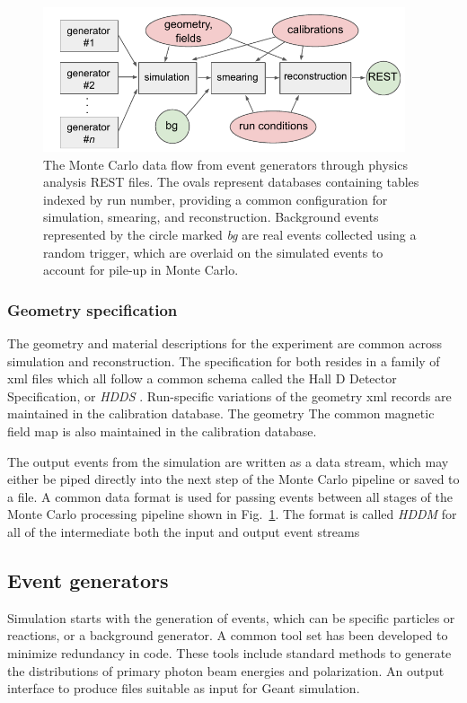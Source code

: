 \begin{figure}[t]\centering
\includegraphics[width=0.95\textwidth]{figures/MonteCarlo_flow.pdf}
\caption[]{\label{fig:MC-data-flow}The Monte Carlo data flow from event generators through physics analysis REST files. The ovals represent databases containing tables indexed by run number, providing a common configuration for simulation, smearing, and reconstruction. Background events represented by the circle marked \emph{bg} are real events collected using a random trigger, which are overlaid on the simulated events to account for pile-up in Monte Carlo.}
\end{figure}

\subsubsection[Material thickness]{\label{sec:materialscan}Geometry specification}
The geometry and material descriptions for the experiment are common across simulation and reconstruction. The specification for both resides in a family of xml files which all follow a common schema called the Hall D Detector Specification, or \emph{HDDS} \cite{CITATION??}. Run-specific variations of the geometry xml records are maintained in the calibration database. The geometry The common magnetic field map is also maintained in the calibration database.

The output events from the simulation are written as a data stream, which may either be piped directly into the next step of the Monte Carlo pipeline or saved to a file. A common data format is used for passing events between all stages of the Monte Carlo processing pipeline shown in Fig.~\ref{fig:MC-data-flow}. The format is called {\em HDDM} for all of the intermediate both the input and output event streams 

\subsection{Event generators \label{sec:generators}}
Simulation starts with the generation of events, which can be specific particles or reactions, or a background generator. A common tool set has been developed to minimize redundancy in code. These tools include standard methods to generate the distributions of primary photon beam energies and polarization. An output interface to produce files suitable as input for Geant simulation.

